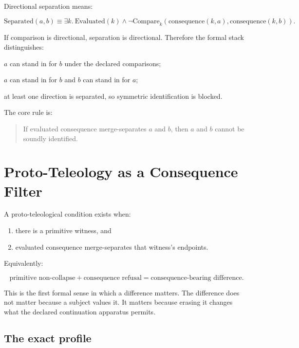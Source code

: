 \documentclass[11pt]{article}
\begin{document}
Directional separation means:

\[
\mathrm{Separated}(a,b) \equiv
\exists k.\ \mathrm{Evaluated}(k) \wedge
\neg \mathrm{Compare}_k(\mathrm{consequence}(k,a),\mathrm{consequence}(k,b)).
\]

If comparison is directional, separation is directional. Therefore the formal
stack distinguishes:

\begin{description}[leftmargin=*]
  \item[one-way allowance] \(a\) can stand in for \(b\) under the declared
  comparisons;
  \item[symmetric identification] \(a\) can stand in for \(b\) and \(b\) can
  stand in for \(a\);
  \item[merge separation] at least one direction is separated, so symmetric
  identification is blocked.
\end{description}

The core rule is:

\begin{quote}
If evaluated consequence merge-separates \(a\) and \(b\), then \(a\) and \(b\)
cannot be soundly identified.
\end{quote}

\section{Proto-Teleology as a Consequence Filter}

A proto-teleological condition exists when:

\begin{enumerate}[leftmargin=*]
  \item there is a primitive witness, and
  \item evaluated consequence merge-separates that witness's endpoints.
\end{enumerate}

Equivalently:

\[
\text{primitive non-collapse}
+
\text{consequence refusal}
=
\text{consequence-bearing difference}.
\]

This is the first formal sense in which a difference matters. The difference
does not matter because a subject values it. It matters because erasing it
changes what the declared continuation apparatus permits.

\subsection{The exact profile}
\end{document}
